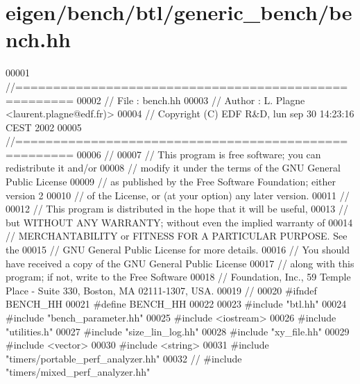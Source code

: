 \hypertarget{eigen_2bench_2btl_2generic__bench_2bench_8hh_source}{}\section{eigen/bench/btl/generic\+\_\+bench/bench.hh}
\label{eigen_2bench_2btl_2generic__bench_2bench_8hh_source}

\begin{DoxyCode}
00001 \textcolor{comment}{//=====================================================}
00002 \textcolor{comment}{// File   :  bench.hh}
00003 \textcolor{comment}{// Author :  L. Plagne <laurent.plagne@edf.fr)>}
00004 \textcolor{comment}{// Copyright (C) EDF R&D,  lun sep 30 14:23:16 CEST 2002}
00005 \textcolor{comment}{//=====================================================}
00006 \textcolor{comment}{//}
00007 \textcolor{comment}{// This program is free software; you can redistribute it and/or}
00008 \textcolor{comment}{// modify it under the terms of the GNU General Public License}
00009 \textcolor{comment}{// as published by the Free Software Foundation; either version 2}
00010 \textcolor{comment}{// of the License, or (at your option) any later version.}
00011 \textcolor{comment}{//}
00012 \textcolor{comment}{// This program is distributed in the hope that it will be useful,}
00013 \textcolor{comment}{// but WITHOUT ANY WARRANTY; without even the implied warranty of}
00014 \textcolor{comment}{// MERCHANTABILITY or FITNESS FOR A PARTICULAR PURPOSE.  See the}
00015 \textcolor{comment}{// GNU General Public License for more details.}
00016 \textcolor{comment}{// You should have received a copy of the GNU General Public License}
00017 \textcolor{comment}{// along with this program; if not, write to the Free Software}
00018 \textcolor{comment}{// Foundation, Inc., 59 Temple Place - Suite 330, Boston, MA  02111-1307, USA.}
00019 \textcolor{comment}{//}
00020 \textcolor{preprocessor}{#ifndef BENCH\_HH}
00021 \textcolor{preprocessor}{#define BENCH\_HH}
00022 
00023 \textcolor{preprocessor}{#include "btl.hh"}
00024 \textcolor{preprocessor}{#include "bench\_parameter.hh"}
00025 \textcolor{preprocessor}{#include <iostream>}
00026 \textcolor{preprocessor}{#include "utilities.h"}
00027 \textcolor{preprocessor}{#include "size\_lin\_log.hh"}
00028 \textcolor{preprocessor}{#include "xy\_file.hh"}
00029 \textcolor{preprocessor}{#include <vector>}
00030 \textcolor{preprocessor}{#include <string>}
00031 \textcolor{preprocessor}{#include "timers/portable\_perf\_analyzer.hh"}
00032 \textcolor{comment}{// #include "timers/mixed\_perf\_analyzer.hh"}

\end{DoxyCode}
